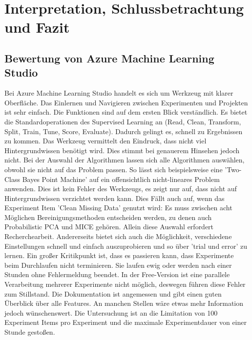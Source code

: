 \chapter{Interpretation, Schlussbetrachtung und Fazit}\label{chap:Bewertung}


\section{Bewertung von Azure Machine Learning Studio}\label{sec:BeswertungAzure}
Bei Azure Machine Learning Studio handelt es sich um Werkzeug mit klarer Oberfläche. Das Einlernen und Navigieren zwischen Experimenten und Projekten ist sehr einfach. Die Funktionen sind auf dem ersten Blick verständlich. Es bietet die Standardoperationen des Supervised Learning an (Read, Clean, Transform, Split, Train, Tune, Score, Evaluate). Dadurch gelingt es, schnell zu Ergebnissen zu kommen.\newline
Das Werkzeug vermittelt den Eindruck, dass nicht viel Hintergrundwissen benötigt wird. Dies stimmt bei genauerem Hinsehen jedoch nicht. Bei der Auswahl der Algorithmen lassen sich alle Algorithmen auswählen, obwohl sie nicht auf das Problem passen. So lässt sich beispielsweise eine 'Two-Class Bayes Point Machine' auf ein offensichtlich nicht-lineares Problem anwenden. Dies ist kein Fehler des Werkzeugs, es zeigt nur auf, dass nicht auf Hintergrundwissen verzichtet werden kann. Dies Fällt auch auf, wenn  das Experiment Item 'Clean Missing Data' genutzt wird: Es muss zwischen acht Möglichen Bereinigungsmethoden entscheiden werden, zu denen auch Probabilistic PCA und MICE gehören. Allein diese Auswahl erfordert Recherchearbeit.
Andererseits bietet sich auch die Möglichkeit, verschiedene Einstellungen schnell und einfach auszuprobieren und so über 'trial und error' zu lernen.\newline
Ein großer Kritikpunkt ist, dass es passieren kann, dass Experimente beim Durchlaufen nicht terminieren. Sie laufen ewig oder werden nach einer Stunden ohne Fehlermeldung beendet. In der Free-Version ist eine parallele Verarbeitung mehrerer Experimente nicht möglich, deswegen führen diese Fehler zum Stillstand.\newline
Die Dokumentation ist angemessen und gibt einen guten Überblick über alle Features. An manchen Stellen wäre etwas mehr Information jedoch wünschenswert. Die Untersuchung ist an die Limitation von 100 Experiment Items pro Experiment und die maximale Experimentdauer von einer Stunde gestoßen.\newline
